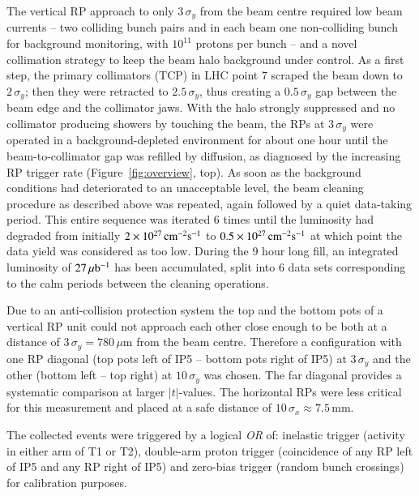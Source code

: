 The vertical RP approach to only $3\,\sigma_{y}$ from the beam centre required
low beam currents -- two colliding bunch pairs and in each beam one 
non-colliding bunch for background monitoring, with $10^{11}$ protons per bunch 
-- and a novel collimation strategy 
to keep the beam halo background under control. As a first step, the primary 
collimators (TCP) in LHC point 7 scraped the beam down to $2\,\sigma_{y}$; then 
they were retracted to $2.5\,\sigma_{y}$, thus creating a $0.5\,\sigma_{y}$ gap 
between
the beam edge and the collimator jaws. With the halo strongly suppressed 
and no collimator producing showers by touching the beam, the RPs at 
$3\,\sigma_{y}$ were operated in a background-depleted environment for about one 
hour until the beam-to-collimator gap was refilled by diffusion, as 
diagnosed by the increasing RP trigger rate (Figure~\ref{fig:overview}, top). As soon as the background conditions
had deteriorated to an unacceptable level, the beam cleaning procedure as described above was repeated, again followed by a quiet data-taking period.
This entire sequence was iterated 6 times until the luminosity had degraded 
from initially $2\times10^{27}\,\rm cm^{-2}s^{-1}$ to 
$0.5\times10^{27}\,\rm cm^{-2}s^{-1}$  %
at which point the data yield was considered as too low. 
During the 9 hour long fill, an integrated luminosity of $27\,\rm \mu b^{-1}$ 
 has been  
accumulated, split into 6 data sets corresponding to the calm periods between
the cleaning operations. 

Due to an anti-collision protection system the top and the bottom pots of a 
vertical RP unit could not approach each other close enough to be both at a 
distance of $3\,\sigma_{y} = 780\,\mu$m from the beam centre. Therefore a 
configuration with one RP diagonal (top pots left of IP5 -- bottom pots right
of IP5) at $3\,\sigma_{y}$ and the other (bottom left -- top right) at 
$10\,\sigma_{y}$ was chosen. The far diagonal provides a systematic comparison
at larger $|t|$-values.
The horizontal RPs were less critical for this measurement and placed at a
safe distance of $10\,\sigma_{x} \approx 7.5$\,mm.

The collected events were triggered by a logical \textit{OR} of: inelastic 
trigger (activity in either arm of T1 or T2), double-arm proton trigger 
(coincidence of any RP left of IP5 and any RP right of IP5) and zero-bias trigger
(random bunch crossings) for calibration purposes.

